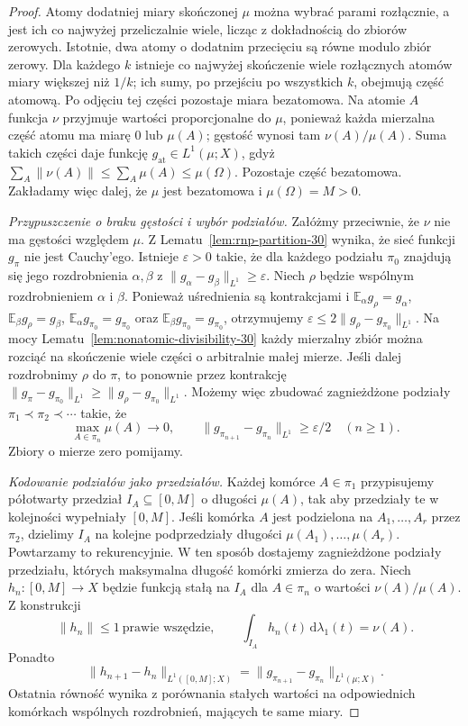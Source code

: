 \documentclass[11pt,a4paper,oneside]{book}
\numberwithin{equation}{chapter}
\theoremstyle{plain}
\theoremstyle{definition}
\theoremstyle{remark}
\begin{document}
\begin{proof}
Atomy dodatniej miary skończonej $\mu$ można
wybrać parami rozłącznie, a jest ich co najwyżej
przeliczalnie wiele, licząc z dokładnością do zbiorów
zerowych. Istotnie, dwa atomy o dodatnim przecięciu
są równe modulo zbiór zerowy. Dla każdego $k$
istnieje co najwyżej skończenie wiele rozłącznych
atomów miary większej niż $1/k$; ich sumy, po
przejściu po wszystkich $k$, obejmują część atomową.
Po odjęciu tej części pozostaje miara bezatomowa.
Na atomie $A$ funkcja
$\nu$ przyjmuje wartości proporcjonalne do $\mu$,
ponieważ każda mierzalna część atomu ma miarę $0$
lub $\mu(A)$; gęstość wynosi tam
$\nu(A)/\mu(A)$. Suma takich części daje funkcję
$g_{\mathrm{at}}\in L^1(\mu;X)$, gdyż
$\sum_A\|\nu(A)\|\le\sum_A\mu(A)\le\mu(\Omega)$.
Pozostaje część bezatomowa. Zakładamy więc dalej,
że $\mu$ jest bezatomowa i $\mu(\Omega)=M>0$.

\emph{Przypuszczenie o braku gęstości i wybór podziałów.}
Załóżmy przeciwnie, że $\nu$ nie ma gęstości
względem $\mu$. Z Lematu~\ref{lem:rnp-partition-30}
wynika, że sieć funkcji $g_\pi$ nie jest Cauchy'ego.
Istnieje $\varepsilon>0$ takie, że dla każdego
podziału $\pi_0$ znajdują się jego rozdrobnienia
$\alpha,\beta$ z
$\|g_\alpha-g_\beta\|_{L^1}\ge\varepsilon$.
Niech $\rho$ będzie wspólnym rozdrobnieniem
$\alpha$ i $\beta$. Ponieważ uśrednienia są
kontrakcjami i $\mathbb E_\alpha g_\rho=g_\alpha$,
$\mathbb E_\beta g_\rho=g_\beta$,
$\mathbb E_\alpha g_{\pi_0}=g_{\pi_0}$ oraz
$\mathbb E_\beta g_{\pi_0}=g_{\pi_0}$,
otrzymujemy
$\varepsilon\le2\|g_\rho-g_{\pi_0}\|_{L^1}$.
Na mocy Lematu~\ref{lem:nonatomic-divisibility-30}
każdy mierzalny zbiór można rozciąć na skończenie
wiele części o arbitralnie małej mierze. Jeśli dalej rozdrobnimy
$\rho$ do $\pi$, to ponownie przez kontrakcję
$\|g_\pi-g_{\pi_0}\|_{L^1}
\ge\|g_\rho-g_{\pi_0}\|_{L^1}$.
Możemy więc zbudować zagnieżdżone podziały
$\pi_1\prec\pi_2\prec\cdots$ takie, że
\begin{equation}\label{eq:rnp-partition-jumps-30}
 \max_{A\in\pi_n}\mu(A)\longrightarrow0,
 \qquad
 \|g_{\pi_{n+1}}-g_{\pi_n}\|_{L^1}
 \ge\varepsilon/2\quad(n\ge1).
\end{equation}
Zbiory o mierze zero pomijamy.

\emph{Kodowanie podziałów jako przedziałów.}
Każdej komórce $A\in\pi_1$ przypisujemy
półotwarty przedział $I_A\subseteq[0,M]$ o
długości $\mu(A)$, tak aby przedziały te
w kolejności wypełniały $[0,M]$.
Jeśli komórka $A$ jest podzielona na
$A_1,\ldots,A_r$ przez $\pi_2$, dzielimy
$I_A$ na kolejne podprzedziały długości
$\mu(A_1),\ldots,\mu(A_r)$. Powtarzamy to
rekurencyjnie. W ten sposób dostajemy zagnieżdżone
podziały przedziału, których maksymalna długość
komórki zmierza do zera. Niech $h_n:[0,M]\to X$
będzie funkcją stałą na $I_A$ dla $A\in\pi_n$
o wartości $\nu(A)/\mu(A)$. Z konstrukcji
\[
 \|h_n\|\le1\ \text{prawie wszędzie},\qquad
 \int_{I_A}h_n(t)\,\mathrm d\lambda_1(t)=\nu(A).
\]
Ponadto
\[
 \|h_{n+1}-h_n\|_{L^1([0,M];X)}
 =\|g_{\pi_{n+1}}-g_{\pi_n}\|_{L^1(\mu;X)}.
\]
Ostatnia równość wynika z porównania stałych
wartości na odpowiednich komórkach wspólnych
rozdrobnień, mających te same miary.


\end{proof}
\end{document}
